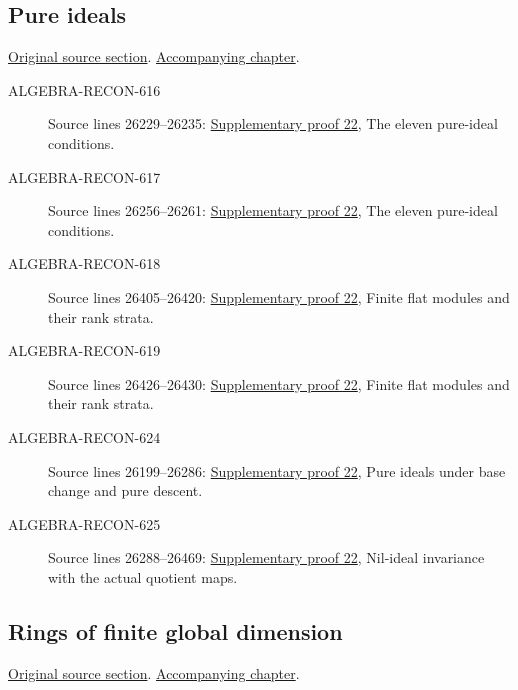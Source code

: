 \subsection{Pure ideals}
\hypertarget{algebra-source-section-pure-ideals}{}
\noindent\href{https://github.com/stacks/stacks-project/blob/a04446e57ec1fbc252a871afcec7752fb2807b14/algebra.tex\#L26192}{Original source section}. \href{algebra.pdf\#nameddest=section-pure-ideals}{Accompanying chapter}.

\begin{description}
\item[ALGEBRA-RECON-616] Source lines 26229--26235: \hyperlink{algebra_pure_global_notes_20260928}{Supplementary proof 22}, The eleven pure-ideal conditions.
\item[ALGEBRA-RECON-617] Source lines 26256--26261: \hyperlink{algebra_pure_global_notes_20260928}{Supplementary proof 22}, The eleven pure-ideal conditions.
\item[ALGEBRA-RECON-618] Source lines 26405--26420: \hyperlink{algebra_pure_global_notes_20260928}{Supplementary proof 22}, Finite flat modules and their rank strata.
\item[ALGEBRA-RECON-619] Source lines 26426--26430: \hyperlink{algebra_pure_global_notes_20260928}{Supplementary proof 22}, Finite flat modules and their rank strata.
\item[ALGEBRA-RECON-624] Source lines 26199--26286: \hyperlink{algebra_pure_global_notes_20260928}{Supplementary proof 22}, Pure ideals under base change and pure descent.
\item[ALGEBRA-RECON-625] Source lines 26288--26469: \hyperlink{algebra_pure_global_notes_20260928}{Supplementary proof 22}, Nil-ideal invariance with the actual quotient maps.
\end{description}

\subsection{Rings of finite global dimension}
\hypertarget{algebra-source-section-ring-finite-gl-dim}{}
\noindent\href{https://github.com/stacks/stacks-project/blob/a04446e57ec1fbc252a871afcec7752fb2807b14/algebra.tex\#L26477}{Original source section}. \href{algebra.pdf\#nameddest=section-ring-finite-gl-dim}{Accompanying chapter}.

